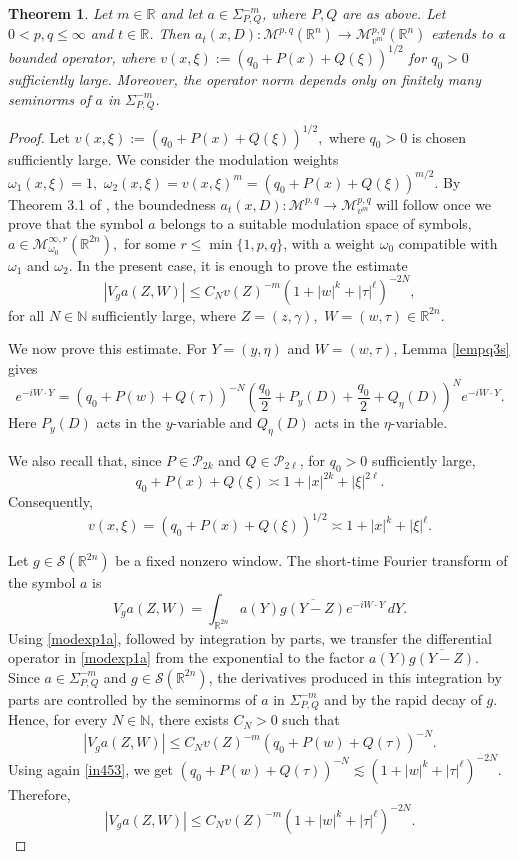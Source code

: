 \documentclass[12pt, reqno]{amsart}
\newcommand{\M}{\mathcal{M}}
\newtheorem{theorem}{Theorem}[section]
\theoremstyle{definition}
\theoremstyle{remark}
\numberwithin{equation}{section}
\begin{document}
\begin{theorem}\label{modb12}
Let $m\in\mathbb{R}$ and let $a\in\Sigma_{P,Q}^{-m}$, where $P,Q$ are as above. Let $0<p,q\leq\infty$ and $t\in\mathbb{R}$. Then $a_t(x,D):\M^{p,q}(\mathbb{R}^n)\longrightarrow \M_{v^m}^{p,q}(\mathbb{R}^n)$
extends to a bounded operator, where $v(x,\xi):=(q_0+P(x)+Q(\xi))^{1/2}$
for $q_0>0$ sufficiently large. Moreover, the operator norm depends only on finitely many seminorms of $a$ in $\Sigma_{P,Q}^{-m}$.
\end{theorem}

\begin{proof}
Let $v(x,\xi):=(q_0+P(x)+Q(\xi))^{1/2},$
where $q_0>0$ is chosen sufficiently large. We consider the modulation weights $\omega_1(x,\xi)=1,
\,\,
\omega_2(x,\xi)=v(x,\xi)^m=(q_0+P(x)+Q(\xi))^{m/2}.$
By Theorem 3.1 of \cite{toft1:mod}, the boundedness $a_t(x,D):\M^{p,q}\rightarrow \M_{v^m}^{p,q}$
will follow once we prove that the symbol $a$ belongs to a suitable modulation space of symbols, $a\in \M_{\omega_0}^{\infty,r}(\mathbb{R}^{2n}),$
for some $r\leq \min\{1,p,q\}$, with a weight $\omega_0$ compatible with $\omega_1$ and $\omega_2$. In the present case, it is enough to prove the estimate
\[
|V_g a(Z,W)|
\leq
C_N v(Z)^{-m}
(1+|w|^k+|\tau|^\ell)^{-2N},
\]
for all $N\in\mathbb{N}$ sufficiently large, where $Z=(z,\gamma),\,\, W=(w,\tau)\in\mathbb{R}^{2n}.$

We now prove this estimate. For $Y=(y,\eta)$ and $W=(w,\tau)$, Lemma \ref{lempq3s} gives
\begin{equation}\label{modexp1a}
e^{-iW\cdot Y}
=
(q_0+P(w)+Q(\tau))^{-N}
\left(
\frac{q_0}{2}+P_y(D)+\frac{q_0}{2}+Q_\eta(D)
\right)^N
e^{-iW\cdot Y}.
\end{equation}
Here $P_y(D)$ acts in the $y$-variable and $Q_\eta(D)$ acts in the $\eta$-variable.

We also recall that, since $P\in\mathcal P_{2k}$ and $Q\in\mathcal P_{2\ell}$, for $q_0>0$ sufficiently large,
\[
q_0+P(x)+Q(\xi)
\asymp
1+|x|^{2k}+|\xi|^{2\ell}.
\]
Consequently,
\begin{equation}\label{in453}
v(x,\xi)
=
(q_0+P(x)+Q(\xi))^{1/2}
\asymp
1+|x|^k+|\xi|^\ell.
\end{equation}

Let $g\in\mathcal S(\mathbb{R}^{2n})$ be a fixed nonzero window. The short-time Fourier transform of the symbol $a$ is
\[
V_g a(Z,W)
=
\int_{\mathbb{R}^{2n}}
a(Y)\overline{g(Y-Z)}e^{-iW\cdot Y}\,dY.
\]
Using \eqref{modexp1a}, followed by integration by parts, we transfer the differential operator in \eqref{modexp1a} from the exponential to the factor $a(Y)\overline{g(Y-Z)}.$
Since $a\in\Sigma_{P,Q}^{-m}$ and $g\in\mathcal S(\mathbb{R}^{2n})$, the derivatives produced in this integration by parts are controlled by the seminorms of $a$ in $\Sigma_{P,Q}^{-m}$ and by the rapid decay of $g$. Hence, for every $N\in\mathbb{N}$, there exists $C_N>0$ such that
\begin{equation}\label{tt67}
|V_g a(Z,W)|
\leq
C_N
v(Z)^{-m}
(q_0+P(w)+Q(\tau))^{-N}.
\end{equation}
Using again \eqref{in453}, we get $(q_0+P(w)+Q(\tau))^{-N}
\lesssim
(1+|w|^k+|\tau|^\ell)^{-2N}.$
Therefore,
\[
|V_g a(Z,W)|
\leq
C_N
v(Z)^{-m}
(1+|w|^k+|\tau|^\ell)^{-2N}.
\]


\end{proof}
\end{document}
